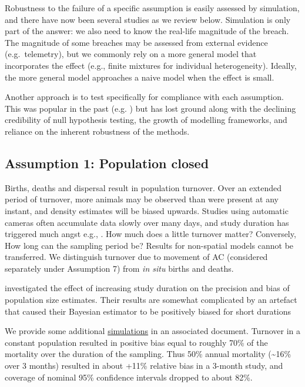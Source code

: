 \documentclass[
]{book}
\begin{document}
Robustness to the failure of a specific assumption is easily assessed by simulation, and there have now been several studies as we review below. Simulation is only part of the answer: we also need to know the real-life magnitude of the breach. The magnitude of some breaches may be assessed from external evidence (e.g.~telemetry), but we commonly rely on a more general model that incorporates the effect (e.g., finite mixtures for individual heterogeneity). Ideally, the more general model approaches a naive model when the effect is small.

Another approach is to test specifically for compliance with each assumption. This was popular in the past (e.g. \citet{obwa78}) but has lost ground along with the declining credibility of null hypothesis testing, the growth of modelling frameworks, and reliance on the inherent robustness of the methods.

\subsection{Assumption 1: Population closed}\label{assumption-1-population-closed}

Births, deaths and dispersal result in population turnover. Over an extended period of turnover, more animals may be observed than were present at any instant, and density estimates will be biased upwards. Studies using automatic cameras often accumulate data slowly over many days, and study duration has triggered much angst e.g., \citet{Harihar2017}. How much does a little turnover matter? Conversely, How long can the sampling period be? Results for non-spatial models \citep{Kendall1999} cannot be transferred. We distinguish turnover due to movement of AC (considered separately under Assumption 7) from \emph{in situ} births and deaths.

\citet{Dupont2019} investigated the effect of increasing study duration on the precision and bias of population size estimates. Their results are somewhat complicated by an artefact that caused their Bayesian estimator to be positively biased for short durations

We provide some additional \href{https://www.otago.ac.nz/density/simulations/secr-simulations.html}{simulations} in an associated document. Turnover in a constant population resulted in positive bias equal to roughly 70\% of the mortality over the duration of the sampling. Thus 50\% annual mortality (\textasciitilde16\% over 3 months) resulted in about +11\% relative bias in a 3-month study, and coverage of nominal 95\% confidence intervals dropped to about 82\%.
\end{document}
